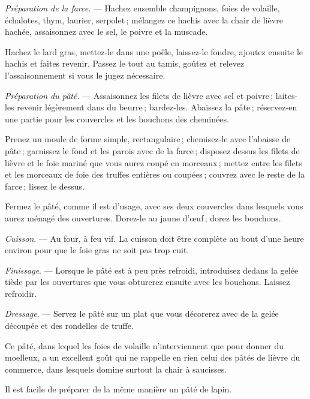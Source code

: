 \medskip

\textit{Préparation de la farce}. — Hachez ensemble champignons, foies de
volaille, échalotes, thym, laurier, serpolet ; mélangez ce hachis avec la chair
de lièvre hachée, assaisonnez avec le sel, le poivre et la muscade.

Hachez le lard gras, mettez-le dans une poêle, laissez-le fondre, ajoutez
ensuite le hachis et faites revenir. Passez le tout au tamis, goûtez et relevez
l’assaisonnement si vous le jugez nécessaire.

\medskip

\textit{Préparation du pâté}. — Assaisonnez les filets de lièvre avec sel et
poivre ; laites-les revenir légèrement dans du beurre ; bardez-les. Abaissez la
pâte ; réservez-en une partie pour les couvercles et les bouchons des cheminées.

Prenez un moule de forme simple, rectangulaire ; chemisez-le avec l'abaisse de
pâte ; garnissez le fond et les parois avec de la farce ; disposez dessus les
filets de lièvre et le foie mariné que vous aurez coupé en morceaux ; mettez
entre les filets et les morceaux de foie des truffes entières ou coupées ;
couvrez avec le reste de la farce ; lissez le dessus.

Fermez le pâté, comme il est d'usage, avec ses deux couvercles dans lesquels
vous aurez ménagé des ouvertures. Dorez-le au jaune d'œuf ; dorez les bouchons.

\medskip

\textit{Cuisson}. — Au four, à feu vif. La cuisson doit être complète au bout
d'une heure environ pour que le foie gras ne soit pas trop cuit.

\medskip

\textit{Finissage}. — Lorsque le pâté est à peu près refroidi, introduisez
dedans la gelée tiède par les ouvertures que vous obturerez ensuite avec les
bouchons. Laissez refroidir.

\medskip

\textit{Dressage}. — Servez le pâté sur un plat que vous décorerez avec de la
gelée découpée et des rondelles de truffe.

\medskip

Ce pâté, dans lequel les foies de volaille n'interviennent que pour donner du
moelleux, a un excellent goût qui ne rappelle en rien celui des pâtés de lièvre
du commerce, dans lesquels domine surtout la chair à saucisses.

\sk

Il est facile de préparer de la même manière un pâté de lapin.

